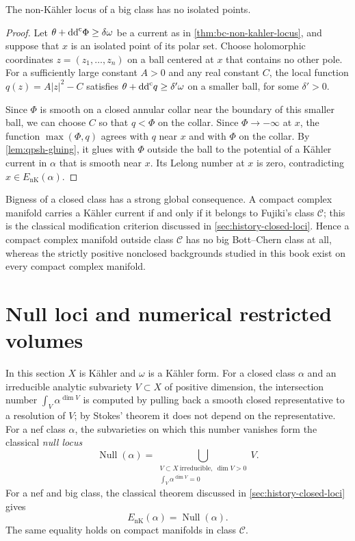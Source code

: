 \begin{proposition}\label{prop:bc-no-isolated-locus}
The non-K\"ahler locus of a big class has no isolated points.
\end{proposition}
\begin{proof}
Let $\theta+\mathrm{dd}^{\mathrm{c}}\Phi\geq\delta\omega$ be a current as in \cref{thm:bc-non-kahler-locus}, and suppose that $x$ is an isolated point of its polar set. Choose holomorphic coordinates $z=(z_1,\ldots,z_n)$ on a ball centered at $x$ that contains no other pole. For a sufficiently large constant $A>0$ and any real constant $C$, the local function $q(z)=A|z|^2-C$ satisfies $\theta+\mathrm{dd}^{\mathrm{c}} q\geq\delta'\omega$ on a smaller ball, for some $\delta'>0$.

Since $\Phi$ is smooth on a closed annular collar near the boundary of this smaller ball, we can choose $C$ so that $q<\Phi$ on the collar. Since $\Phi\to-\infty$ at $x$, the function $\max(\Phi,q)$ agrees with $q$ near $x$ and with $\Phi$ on the collar. By \cref{lem:qpsh-gluing}, it glues with $\Phi$ outside the ball to the potential of a K\"ahler current in $\alpha$ that is smooth near $x$. Its Lelong number at $x$ is zero, contradicting $x\in E_{\mathrm{nK}}(\alpha)$.
\end{proof}

Bigness of a closed class has a strong global consequence. A compact complex manifold carries a K\"ahler current if and only if it belongs to Fujiki's class $\mathcal C$; this is the classical modification criterion discussed in \cref{sec:history-closed-loci}. Hence a compact complex manifold outside class $\mathcal C$ has no big Bott--Chern class at all, whereas the strictly positive nonclosed backgrounds studied in this book exist on every compact complex manifold.

\section{Null loci and numerical restricted volumes}
\label{sec:bc-null-loci}

In this section $X$ is K\"ahler and $\omega$ is a K\"ahler form. For a closed class $\alpha$ and an irreducible analytic subvariety $V\subset X$ of positive dimension, the intersection number $\int_V\alpha^{\dim V}$ is computed by pulling back a smooth closed representative to a resolution of $V$; by Stokes' theorem it does not depend on the representative. For a nef class $\alpha$, the subvarieties on which this number vanishes form the classical \emph{null locus}
\[
 \operatorname{Null}(\alpha)
 =\bigcup_{\substack{V\subset X\ \mathrm{irreducible},\ \dim V>0\\
                       \int_V\alpha^{\dim V}=0}}V.
\]
For a nef and big class, the classical theorem discussed in \cref{sec:history-closed-loci} gives
\[
 E_{\mathrm{nK}}(\alpha)=\operatorname{Null}(\alpha).
\]
The same equality holds on compact manifolds in class $\mathcal C$.

